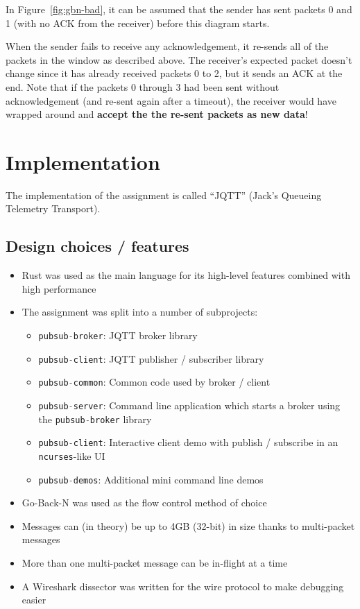 \documentclass[a4paper]{article}
\numberwithin{figure}{section}
\numberwithin{table}{section}
\newcommand{\mi}{\mintinline}
\begin{document}
\newpage
In Figure~\ref{fig:gbn-bad}, it can be assumed that the sender has sent packets 0 and 1 (with no ACK from the receiver) before this diagram starts.

When the sender fails to receive any acknowledgement, it re-sends all of the packets in the window as described above. The receiver's expected packet doesn't change since it has already received packets 0 to 2, but it sends an ACK at the end. Note that if the packets 0 through 3 had been sent without acknowledgement (and re-sent again after a timeout), the receiver would have wrapped around and \textbf{accept the the re-sent packets as new data}!

\section{Implementation}
The implementation of the assignment is called ``JQTT'' (Jack's Queueing Telemetry Transport).
\subsection{Design choices / features}
\begin{itemize}
	\item Rust was used as the main language for its high-level features combined with high performance \cite{rust-lang}
	\item The assignment was split into a number of subprojects:
		\begin{itemize}
			\item \mi{c}{pubsub-broker}: JQTT broker library
			\item \mi{c}{pubsub-client}: JQTT publisher / subscriber library
			\item \mi{c}{pubsub-common}: Common code used by broker / client
			\item \mi{c}{pubsub-server}: Command line application which starts a broker using the \mi{c}{pubsub-broker} library
			\item \mi{c}{pubsub-client}: Interactive client demo with publish / subscribe in an \mi{c}{ncurses}-like UI
			\item \mi{c}{pubsub-demos}: Additional mini command line demos
		\end{itemize}
	\item Go-Back-N was used as the flow control method of choice
	\item Messages can (in theory) be up to 4GB (32-bit) in size thanks to multi-packet messages
	\item More than one multi-packet message can be in-flight at a time
	\item A Wireshark dissector was written for the wire protocol to make debugging easier
\end{itemize}

\clearpage
{}
{}
\printbibliography
\end{document}
